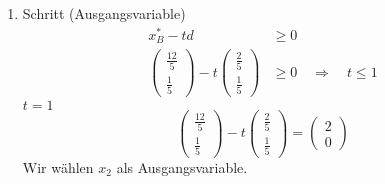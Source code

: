\documentclass[a4paper]{scrartcl}
\begin{document}
\begin{enumerate}[label=\bfseries\arabic*.]
\begin{enumerate}[1.]
\begin{enumerate}[1.]
                    \item Schritt (Ausgangsvariable)
                        \begin{equation}
                            \begin{split}
                                x_B^* - td &\geq 0 \\
                                \begin{pmatrix}
                                    \frac{12}{5} \\ \frac{1}{5}
                                \end{pmatrix}
                                - t
                                \begin{pmatrix}
                                    \frac{2}{5} \\ \frac{1}{5}
                                \end{pmatrix}
                                &\geq 0
                                \quad\Rightarrow\quad
                                t \leq 1
                            \end{split}
                        \end{equation}
                        $t = 1$
                        \begin{equation}
                            \begin{pmatrix}
                                \frac{12}{5} \\ \frac{1}{5}
                            \end{pmatrix}
                            - t
                            \begin{pmatrix}
                                \frac{2}{5} \\ \frac{1}{5}
                            \end{pmatrix}
                            =
                            \begin{pmatrix}
                                2 \\ 0
                            \end{pmatrix}
                        \end{equation}
                        Wir wählen $x_2$ als Ausgangsvariable.


\end{enumerate}
\end{enumerate}
\end{enumerate}
\end{document}
